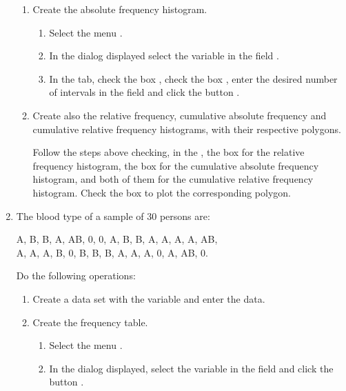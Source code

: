 \begin{enumerate}[leftmargin=*]
\begin{enumerate}
\item Create the absolute frequency histogram.
\begin{indication}
\begin{enumerate}
\item Select the menu .
\item In the dialog displayed select the variable  in the field .
\item In the  tab, check the box , check the box
, enter the desired number of intervals in the field  and click
the button .
\end{enumerate}
\end{indication}

\item Create also the relative frequency, cumulative absolute frequency and cumulative relative frequency
histograms, with their respective polygons.
\begin{indication}Follow the steps above checking, in the ,
the box  for the relative frequency histogram, the box  for
the cumulative absolute frequency histogram, and both of them for the cumulative relative frequency histogram.
Check the box  to plot the corresponding polygon. 
\end{indication}
\end{enumerate}

\item The blood type of a sample of 30 persons are:
\begin{center}
A, B, B, A, AB, 0, 0, A, B, B, A, A, A, A, AB,\\
A, A, A, B, 0, B, B, B, A, A, A, 0, A, AB, 0. 
\end{center}
Do the following operations:
\begin{enumerate}
\item Create a data set with the variable  and enter the data.

\item Create the frequency table.
\begin{indication}
\begin{enumerate}
\item Select the menu .
\item In the dialog displayed, select the variable  in the field
 and click the button .
\end{enumerate}
\end{indication}


\end{enumerate}
\end{enumerate}
